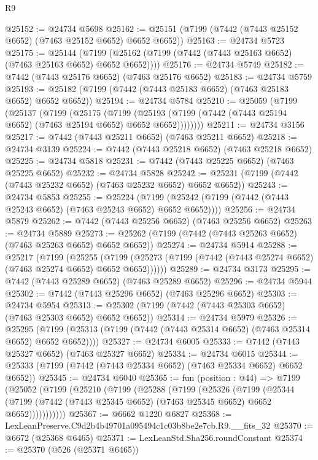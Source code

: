 \begin{lexlean}{R9}
\begin{coremodule}
@25152 := @24734 @5698
@25162 := @25151 (@7199 (@7442 (@7443 @25152 @6652) (@7463 @25152 @6652) @6652 @6652))
@25163 := @24734 @5723
@25175 := @25144
    (@7199 (@25162 (@7199 (@7442 (@7443 @25163 @6652) (@7463 @25163 @6652) @6652 @6652))))
@25176 := @24734 @5749
@25182 := @7442 (@7443 @25176 @6652) (@7463 @25176 @6652)
@25183 := @24734 @5759
@25193 := @25182 (@7199 (@7442 (@7443 @25183 @6652) (@7463 @25183 @6652) @6652 @6652))
@25194 := @24734 @5784
@25210 := @25059
    (@7199
      (@25137
        (@7199
          (@25175
            (@7199
              (@25193 (@7199 (@7442 (@7443 @25194 @6652) (@7463 @25194 @6652) @6652 @6652))))))))
@25211 := @24734 @3156
@25217 := @7442 (@7443 @25211 @6652) (@7463 @25211 @6652)
@25218 := @24734 @3139
@25224 := @7442 (@7443 @25218 @6652) (@7463 @25218 @6652)
@25225 := @24734 @5818
@25231 := @7442 (@7443 @25225 @6652) (@7463 @25225 @6652)
@25232 := @24734 @5828
@25242 := @25231 (@7199 (@7442 (@7443 @25232 @6652) (@7463 @25232 @6652) @6652 @6652))
@25243 := @24734 @5853
@25255 := @25224
    (@7199 (@25242 (@7199 (@7442 (@7443 @25243 @6652) (@7463 @25243 @6652) @6652 @6652))))
@25256 := @24734 @5879
@25262 := @7442 (@7443 @25256 @6652) (@7463 @25256 @6652)
@25263 := @24734 @5889
@25273 := @25262 (@7199 (@7442 (@7443 @25263 @6652) (@7463 @25263 @6652) @6652 @6652))
@25274 := @24734 @5914
@25288 := @25217
    (@7199
      (@25255
        (@7199 (@25273 (@7199 (@7442 (@7443 @25274 @6652) (@7463 @25274 @6652) @6652 @6652))))))
@25289 := @24734 @3173
@25295 := @7442 (@7443 @25289 @6652) (@7463 @25289 @6652)
@25296 := @24734 @5944
@25302 := @7442 (@7443 @25296 @6652) (@7463 @25296 @6652)
@25303 := @24734 @5954
@25313 := @25302 (@7199 (@7442 (@7443 @25303 @6652) (@7463 @25303 @6652) @6652 @6652))
@25314 := @24734 @5979
@25326 := @25295
    (@7199 (@25313 (@7199 (@7442 (@7443 @25314 @6652) (@7463 @25314 @6652) @6652 @6652))))
@25327 := @24734 @6005
@25333 := @7442 (@7443 @25327 @6652) (@7463 @25327 @6652)
@25334 := @24734 @6015
@25344 := @25333 (@7199 (@7442 (@7443 @25334 @6652) (@7463 @25334 @6652) @6652 @6652))
@25345 := @24734 @6040
@25365 := fun (position : @44) =>
  @7199
    (@25052
      (@7199
        (@25210
          (@7199
            (@25288
              (@7199
                (@25326
                  (@7199
                    (@25344
                      (@7199 (@7442 (@7443 @25345 @6652) (@7463 @25345 @6652) @6652 @6652)))))))))))
@25367 := @6662 @1220 @6827
@25368 := LexLeanPreserve.C9d2b4b49701a095494c1c03b8be2e7cb.R9.__fits_32
@25370 := @6672 (@25368 @6465)
@25371 := LexLeanStd.Sha256.roundConstant
@25374 := @25370 (@526 (@25371 @6465))

\end{coremodule}
\end{lexlean}
